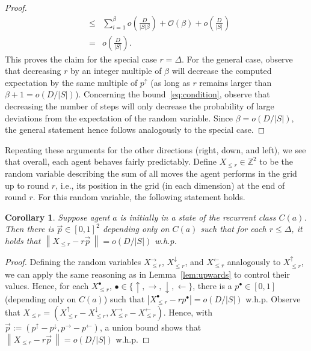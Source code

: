 \documentclass[11pt]{article}
\newtheorem{corollary}[theorem]{Corollary}
\newcommand{\Z}{\mathbb{Z}}
\newcommand{\BO}{\mathcal{O}}
\begin{document}
\begin{proof}
\begin{eqnarray*}
	&\leq & \sum_{i=1}^{\beta}o\left(\frac{D}{|S|\beta}\right)+\BO(\beta) + o\left(\frac{D}{|S|}\right)\\
	&=& o\left(\frac{D}{|S|}\right).
	\end{eqnarray*}
	This proves the claim for the special case $r=\Delta$. For the general case, observe that decreasing $r$ by an integer multiple of $\beta$ will decrease the computed expectation by the same multiple of $p^{\uparrow}$ (as long as $r$ remains larger than $\beta+1= o(D/|S|)$). Concerning the bound~\eqref{eq:condition}, observe that decreasing the number of steps will only decrease the probability of large deviations from the expectation of the random variable.	Since $\beta=o(D/|S|)$, the general statement hence follows analogously to the special case.
\end{proof}


Repeating these arguments for the other directions (right, down, and left), we see that overall, each agent behaves fairly predictably. Define $X_{\leq r}\in \Z^2$ to be the random variable describing the sum of all moves the agent performs in the grid up to round $r$, i.e., its position in the grid (in each dimension) at the end of round $r$. For this random variable, the following statement holds.
\begin{corollary}\label{cor:concentration}
	Suppose agent $a$ is initially in a state of the recurrent class $C(a)$. Then there is $\vec{p}\in [0,1]^2$ depending only on $C(a)$ such that for each $r\leq \Delta$, it holds that $\left\|X_{\leq r}-r\vec{p}\,\right\|= o(D/|S|)$ w.h.p.
\end{corollary}

\begin{proof}
Defining the random variables $X^{\rightarrow}_{\leq r}$, $X^{\downarrow}_{\leq r}$, and $X^{\leftarrow}_{\leq r}$ analogously to $X^{\uparrow}_{\leq r}$, we can apply the same reasoning as in Lemma~\ref{lem:upwards} to control their values. Hence, for each $X^{\bullet}_{\leq r}$, $\bullet\in \{\uparrow,\rightarrow,\downarrow,\leftarrow\}$, there is a $p^{\bullet}\in [0,1]$ (depending only on $C(a)$) such that $\left|X_{\leq r}^{\bullet}-rp^{\bullet}\right| = o(D/|S|)$ w.h.p. Observe that $X_{\leq r}=(X_{\leq r}^{\uparrow}-X_{\leq r}^{\downarrow},X_{\leq r}^{\rightarrow}-X_{\leq r}^{\leftarrow})$. Hence, with $\vec{p}:=(p^{\uparrow}-p^{\downarrow},p^{\rightarrow}-p^{\leftarrow})$, a union bound shows that $\left\|X_{\leq r}-r\vec{p}\,\right\| = o(D/|S|)$ w.h.p.
\end{proof}
\end{document}
